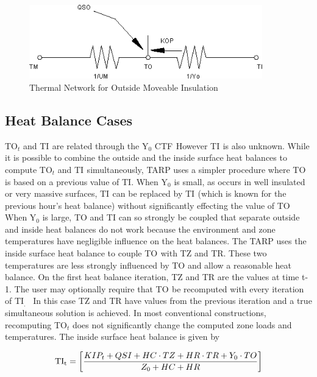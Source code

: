 \begin{figure}[hbtp] %
\centering
\includegraphics[width=0.9\textwidth, height=0.9\textheight, keepaspectratio=true]{media/image422.png}
\caption{  Thermal Network for Outside Moveable Insulation \protect \label{fig:thermal-network-for-outside-moveable}}
\end{figure}

\subsection{Heat Balance Cases}\label{heat-balance-cases}

TO\(_{t}\) and TI\(_{ }\) are related through the Y\(_{0}\) CTF\(_{ }\) However TI\(_{ }\) is also unknown. While it is possible to combine the outside and the inside surface heat balances to compute TO\(_{t}\) and TI\(_{ }\) simultaneously, TARP uses a simpler procedure where TO\(_{ }\) is based on a previous value of TI. When Y\(_{0}\) is small, as occurs in well insulated or very massive surfaces, TI\(_{ }\) can be replaced by TI\(_{ }\) (which is known for the previous hour's heat balance) without significantly effecting the value of TO\(_{ }\) When Y\(_{0}\) is large, TO and TI can so strongly be coupled that separate outside and inside heat balances do not work because the environment and zone temperatures have negligible influence on the heat balances. The TARP uses the inside surface heat balance to couple TO\(_{ }\) with TZ and TR. These two temperatures are less strongly influenced by TO and allow a reasonable heat balance. On the first heat balance iteration, TZ and TR are the values at time t-1. The user may optionally require that TO\(_{ }\) be recomputed with every iteration of TI\(_{.}\) ~In this case TZ and TR have values from the previous iteration and a true simultaneous solution is achieved. In most conventional constructions, recomputing TO\(_{t}\) does not significantly change the computed zone loads and temperatures. The inside surface heat balance is given by

\begin{equation}
{\rm{T}}{{\rm{I}}_{\rm{t}}} = \left[ {\frac{{KI{P_t} + QSI + HC\cdot TZ + HR\cdot TR + {Y_0}\cdot TO}}{{{Z_0} + HC + HR}}} \right]
\end{equation}

